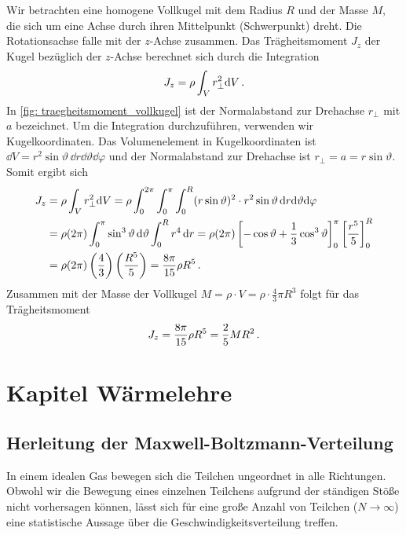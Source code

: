 Wir betrachten eine homogene Vollkugel mit dem Radius $R$ und der Masse $M$, die sich um eine Achse durch ihren Mittelpunkt (Schwerpunkt) dreht. Die Rotationsachse falle mit der $z$-Achse zusammen. Das Trägheitsmoment $J_z$ der Kugel bezüglich der $z$-Achse berechnet sich durch die Integration 
\begin{equation}
    J_z = \rho \int_V r_{\perp}^2 \mathrm{d} V \,.
\end{equation}
In \cref{fig: traegheitsmoment_vollkugel} ist der Normalabstand zur Drehachse $r_{\perp}$ mit $a$ bezeichnet. Um die Integration durchzuführen, verwenden wir Kugelkoordinaten. Das Volumenelement in Kugelkoordinaten ist $\dd V = r^2 \sin\vartheta \,\dd r \dd \vartheta \dd \varphi$ und der Normalabstand zur Drehachse ist $r_{\perp} = a = r \sin\vartheta$. Somit ergibt sich
\begin{align}
    J_z &= \rho \int_V r_{\perp}^2 \mathrm{d} V = \rho \int_0^{2\pi} \int_0^{\pi} \int_0^R (r \sin\vartheta)^2 \cdot r^2 \sin\vartheta \,\mathrm{d} r \mathrm{d} \vartheta \mathrm{d} \varphi \nonumber \\
    &= \rho (2\pi) \int_0^{\pi} \sin^3\vartheta \,\mathrm{d} \vartheta \int_0^R r^4 \,\mathrm{d} r = \rho (2\pi) \left[ -\cos\vartheta + \frac{1}{3}\cos^3\vartheta \right]_0^{\pi} \left[ \frac{r^5}{5} \right]_0^R \nonumber \\
    &= \rho (2\pi) \left( \frac{4}{3} \right) \left( \frac{R^5}{5} \right) = \frac{8\pi}{15} \rho R^5 \,.
\end{align}
Zusammen mit der Masse der Vollkugel $M = \rho \cdot V = \rho \cdot \frac{4}{3} \pi R^3$ folgt für das Trägheitsmoment
\begin{equation}
    J_z = \frac{8\pi}{15} \rho R^5 = \frac{2}{5} M R^2 \,.
\end{equation}


\section{Kapitel Wärmelehre}\label{sec: herleitungen_waermelehre}
\subsection{Herleitung der Maxwell-Boltzmann-Verteilung}\label{subsec: herleitung_maxwell_boltzmann}
In einem idealen Gas bewegen sich die Teilchen ungeordnet in alle Richtungen. Obwohl wir die Bewegung eines einzelnen Teilchens aufgrund der ständigen Stöße nicht vorhersagen können, lässt sich für eine große Anzahl von Teilchen ($N \to \infty$) eine statistische Aussage über die Geschwindigkeitsverteilung treffen.

